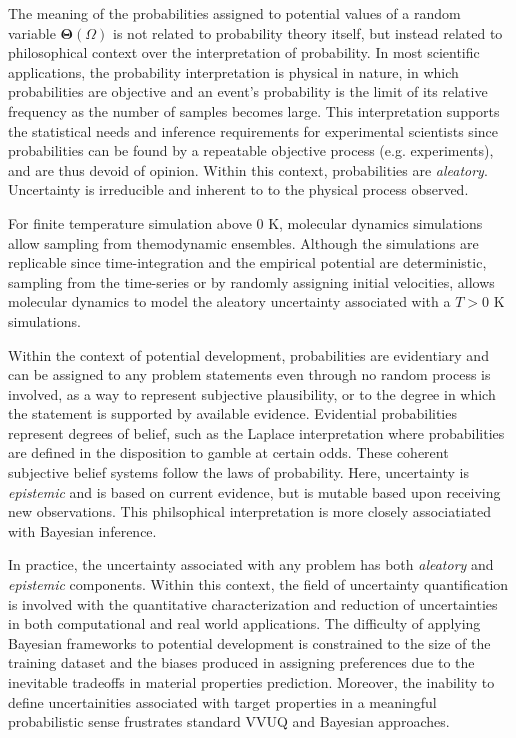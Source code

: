 The meaning of the probabilities assigned to potential values of a random variable $\bm{\Theta}(\Omega)$ is not related to probability theory itself, but instead related to philosophical context over the interpretation of probability.  In most scientific applications, the probability interpretation is physical in nature, in which probabilities are objective and an event's probability is the limit of its relative frequency as the number of samples becomes large.  This interpretation supports the statistical needs and inference requirements for experimental scientists since probabilities can be found by a repeatable objective process (e.g. experiments), and are thus devoid of opinion.  Within this context, probabilities are \emph{aleatory}.  Uncertainty is irreducible and inherent to to the physical process observed.

For finite temperature simulation above $0$ K, molecular dynamics simulations allow sampling from themodynamic ensembles.  Although the simulations are replicable since time-integration and the empirical potential are deterministic, sampling from the time-series or by randomly assigning initial velocities, allows molecular dynamics to model the aleatory uncertainty associated with a $T > 0$ K simulations.

Within the context of potential development, probabilities are evidentiary and can be assigned to any problem statements even through no random process is involved, as a way to represent subjective plausibility, or to the degree in which the statement is supported by available evidence.  Evidential probabilities represent degrees of belief, such as the Laplace interpretation where probabilities are defined in the disposition to gamble at certain odds\cite{laplace1902_probability}.  These coherent subjective belief systems follow the laws of probability\cite{ramsey2016truth,definetti1980_foresight}.  Here, uncertainty is \emph{epistemic} and is based on current evidence, but is mutable based upon receiving new observations\cite{ramsey2016truth,definetti1980_foresight,jaynes2003_probability}.  This philsophical interpretation is more closely associatiated with Bayesian inference\cite{gelman_bayesian}.

In practice, the uncertainty associated with any problem has both \emph{aleatory} and \emph{epistemic} components.  Within this context, the field of uncertainty quantification\cite{oberkampf2010_vvuq} is involved with the quantitative characterization and reduction of uncertainties in both computational and real world applications.  The difficulty of applying Bayesian frameworks to potential development is constrained to the size of the training dataset and the biases produced in assigning preferences due to the inevitable tradeoffs in material properties prediction.  Moreover, the inability to define uncertainities associated with target properties in a meaningful probabilistic sense frustrates standard VVUQ and Bayesian approaches.

